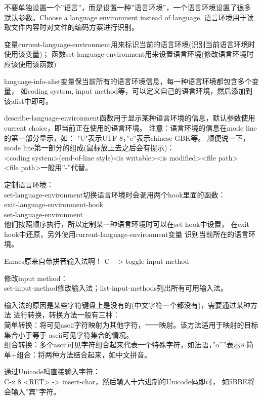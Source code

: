 \documentclass[a4paper,11pt]{article}
\begin{document}
  不要单独设置一个''语言''，而是设置一种''语言环境''，一个语言环境设置了很多
  默认参数。Choose a language environment instead of language.
  语言环境用于读取文件内容时对文件的编码方案进行识别。
  
  变量current-language-environment用来标识当前的语言环境(识别当前语言环境时使用该变量)；
  函数set-language-environment用来设置语言环境(修改语言环境时应该使用该函数)

  language-info-alist变量保当前所有的语言环境信息，每一种语言环境都包含多个变量，
  如coding system, input method等，可以定义自己的语言环境，然后添加到该alist中即可。
  
  describe-language-environment函数用于显示某种语言环境的信息，默认参数使用
  current choice，即当前正在使用的语言环境。
  注意：语言环境的信息在mode line的第一部分显示，如：
  "U"表示UTF-8，''c''表示chinese-GBK等。
  顺便说一下，mode line第一部分的组成(鼠标放上去之后会有提示)：\\
  <coding system>(end-of-line style)<is writable><is modified><file path>\\
  <file path>一般用''-''代替。

  定制语言环境：\\
  set-language-environment切换语言环境时会调用两个hook里面的函数：\\
  exit-language-environment-hook\\
  set-language-environment\\
  他们按照顺序执行，所以定制某一种语言环境时可以在set hook中设置，
  在exit hook中还原，另外使用current-language-environment变量
  识别当前所在的语言环境。

  Emacs原来自带拼音输入法啊！ C-\ -> toggle-input-method

  修改input method：\\
  set-input-method修改输入法；list-input-methods列出所有可用输入法。
  
  输入法的原因是某些字符键盘上是没有的(中文字符一个都没有)，需要通过某种方法
  进行转换，转换方法一般有三种：\\
  简单转换：将可见ascii字符映射为其他字符，一一映射。该方法适用于映射的目标集合小于等于
  ascii可见字符集合的情况。\\
  组合转换：多个ascii可见字符组合起来代表一个特殊字符，如法语，''o\^{}''表示$\hat{o}$
  简单+组合：将两种方法结合起来，如中文拼音。

  通过Unicode吗直接输入字符：\\
  C-x 8 <RET> -> insert-char，然后输入十六进制的Unicode码即可，
  如5BBE将会输入''宾''字符。
\end{document}
